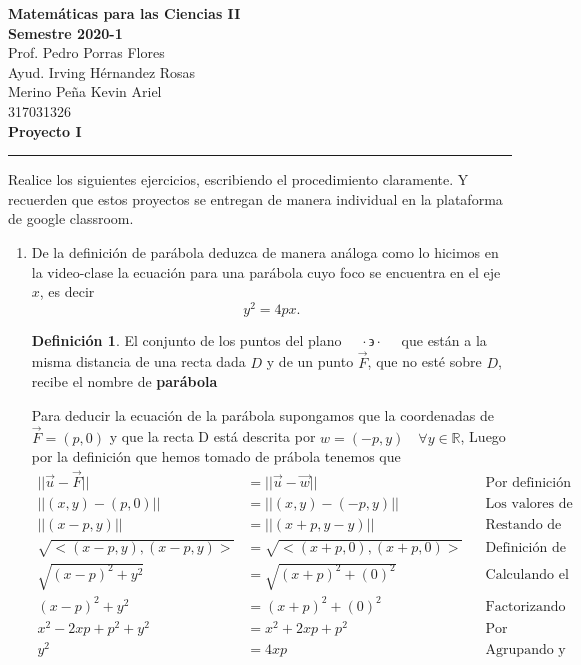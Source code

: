 \documentclass[letterpaper]{article}
\newcommand{\tq}{ \quad \cdot  \backepsilon \cdot \quad }
\newcommand{\R}{\mathds{R}}
\renewcommand{\*}{\cdot}
\theoremstyle{definition}
\newtheorem{definition}{Definición}
\begin{document}
\begin{center}
	\textbf{\large Matemáticas para las Ciencias II}\\
	\textbf{ Semestre 2020-1}\\
	Prof. Pedro Porras Flores\\
	Ayud. Irving Hérnandez Rosas \\
	Merino Peña Kevin Ariel\\ 317031326\\
	\textbf{Proyecto I}
\end{center}
\rule{17cm}{0.3mm}

\noindent Realice los siguientes ejercicios, escribiendo el procedimiento claramente. Y recuerden que estos proyectos se entregan de manera individual en la plataforma de google classroom. 

\begin{enumerate}
	
	
	\item  De la definición de parábola deduzca de manera análoga como lo hicimos en la video-clase la ecuación para una parábola cuyo foco se encuentra en el eje $x$, es decir $$y^2 = 4px.$$ 
	
	\begin{definition}
		El conjunto de los puntos del plano $ \tq $ que están a la misma distancia de una recta dada $ D $ y de un punto $ \vec{F} $, que no esté sobre $ D $, recibe el nombre de \textbf{parábola}
	\end{definition}
	Para deducir la ecuación de la parábola supongamos que la coordenadas de $ \vec{F} = (p,0) $ y que la recta D está descrita por $ w = (-p,y) \quad \forall y \in \R $, Luego por la definición que hemos tomado de prábola tenemos que 
	\begin{align*}
	||\vec{u} - \vec{F} || &= || \vec{u} - \vec{w} || && \text{Por definición de distancia} \\
	||(x,y) - (p,0) || &= || (x,y) - (-p,y) || && \text{Los valores de dichos vectores  } \\
	||(x -p,y)|| &= || (x +p,y-y)|| && \text{Restando de manera directa} \\
	\sqrt{<(x -p,y),(x -p,y)>} &= \sqrt{<(x +p,0),(x +p,0)>} && \text{Definición de la norma en vectores } \\
	\sqrt{(x -p)^2 +y^2} &= \sqrt{(x +p)^2 +(0)^2} && \text{Calculando el producto interior  } \\
	(x -p)^2 +y^2 &= (x +p)^2 +(0)^2 && \text{Factorizando } \\
	x^2 -2xp +p^2 +y^2 &= x^2 +2xp +p^2 && \text{Por distributividad  } \\
	y^2 &= 4xp && \text{Agrupando y sumando términos semejantes}
	\end{align*}
	

\end{enumerate}
\end{document}
